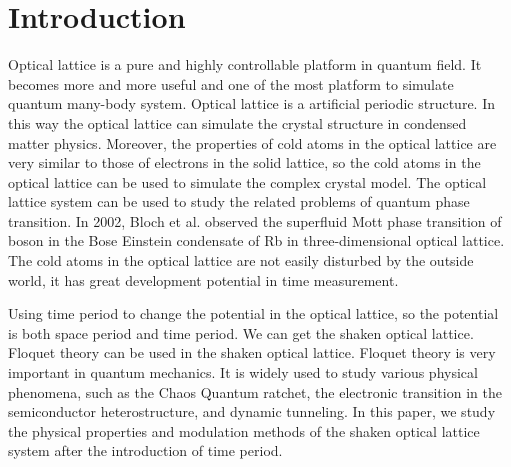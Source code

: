 \documentclass[
 reprint,
 amsmath,amssymb,
 aps,
pra,
floatfix,
]{revtex4-2}
\begin{document}

\section{\label{sec:level1}Introduction}

Optical lattice is a pure and highly controllable platform in quantum field.
It becomes more and more useful and one of the most platform to simulate quantum many-body system.%
Optical lattice is a artificial periodic structure.
In this way the optical lattice can simulate the crystal structure in condensed matter physics. 
Moreover, the properties of cold atoms in the optical lattice are very similar to those of electrons in the solid lattice, 
so the cold atoms in the optical lattice can be used to simulate the complex crystal model.%
The optical lattice system can be used to study the related problems of quantum phase transition. 
In 2002, Bloch et al. observed the superfluid Mott phase transition of boson in the Bose Einstein condensate of Rb in three-dimensional optical lattice.%
The cold atoms in the optical lattice are not easily disturbed by the outside world, it has great development potential in time measurement.%

Using time period to change the potential in the optical lattice, so the potential is both space period and time period.
We can get the shaken optical lattice. Floquet theory can be used in the shaken optical lattice.%
Floquet theory is very important in quantum mechanics. It is widely used to study various physical phenomena, 
such as the Chaos Quantum ratchet, the electronic transition in the semiconductor heterostructure, and dynamic tunneling.%
In this paper, we study the physical properties and modulation methods of the shaken optical lattice system after the introduction of time period.%
\end{document}
